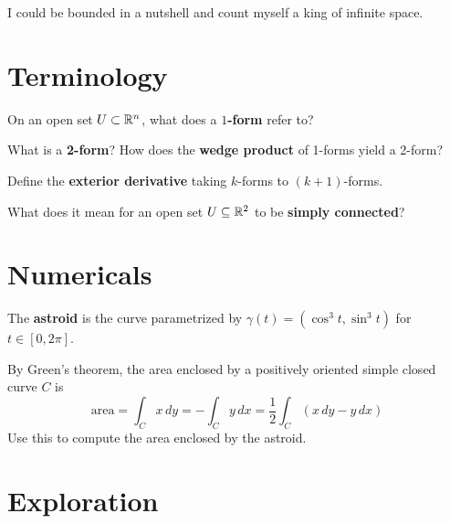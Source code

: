 \documentclass{homework}
\author{Jim Fowler}
\begin{document}
\maketitle

\begin{inspiration}
  I could be bounded in a nutshell and count myself a king of infinite space.
\end{inspiration}

\section{Terminology}

\begin{problem}\label{one-form}%
  On an open set $U \subset \mathbb{R}^n$, what does a \textbf{$1$-form} refer to?
\end{problem}

\begin{problem}\label{two-form}%
  What is a \textbf{2-form}? How does the \textbf{wedge product} of 1-forms yield a 2-form?
\end{problem}

\begin{problem}\label{exterior-derivative}%
  Define the \textbf{exterior derivative} taking $k$-forms to $(k+1)$-forms.
\end{problem}

\begin{problem}
  What does it mean for an open set $U\subseteq\mathbb{R}^2$ to be \textbf{simply connected}?
\end{problem}

\section{Numericals}

\begin{problem}\label{area-forms}%
  The \textbf{astroid} is the curve parametrized by $\gamma(t) = (\cos^3 t, \sin^3 t)$ for $t\in[0,2\pi]$.
  
  By Green's theorem, the area enclosed by a positively oriented simple closed curve $C$ is
  \[
    \text{area} = \int_C x\,dy = -\int_C y\,dx = \frac{1}{2}\int_C\left(x\,dy - y\,dx\right)
  \]
  Use this to compute the area enclosed by the astroid.
\end{problem}

\section{Exploration}
\end{document}
